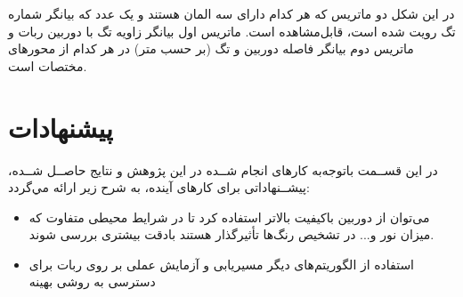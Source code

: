 در این شکل دو ماتریس که هر کدام دارای سه المان هستند و یک عدد که بیانگر شماره تگ رویت شده است، قابل‌مشاهده است.  ماتریس اول  بیانگر زاویه تگ با دوربین ربات و ماتریس دوم بیانگر فاصله دوربین و تگ (بر حسب متر) در هر کدام از محور‌های مختصات است.
\newpage
\section{پیشنهادات}
در اين قســمت باتوجه‌به كارهای انجام شــده در اين پژوهش و نتايج حاصــل شــده، پيشــنهاداتی برای كارهای آينده، به شرح زير ارائه مي‌گردد:
\begin{itemize}
	\item
	می‌توان از دوربین‌ باکیفیت بالاتر استفاده کرد تا در شرایط محیطی متفاوت که میزان نور و... در تشخیص رنگ‌ها تأثیرگذار هستند بادقت بیشتری بررسی شوند.
	\item
	استفاده از الگوریتم‌های دیگر مسیریابی و آزمایش عملی بر روی ربات برای دسترسی به روشی بهینه 
	
\end{itemize}